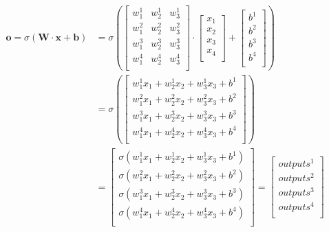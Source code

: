 \documentclass[a4paper, 10pt, twoside]{article}
\begin{document}
\begin{align*}
  \bm{o} = \sigma(\bm{W} \cdot \bm{x} + \bm{b})
  & =
  \sigma \left(
    \begin{bmatrix}
      w_1^1 & w_2^1 & w_3^1 \\
      w_1^2 & w_2^2 & w_3^2 \\
      w_1^3 & w_2^3 & w_3^3 \\
      w_1^4 & w_2^4 & w_3^4 \\
    \end{bmatrix}
    \cdot
    \begin{bmatrix}
      x_1 \\
      x_2 \\
      x_3 \\
      x_4 \\
    \end{bmatrix}
    +
    \begin{bmatrix}
      b^1 \\
      b^2 \\
      b^3 \\
      b^4 \\
    \end{bmatrix}
  \right) \\
  & =
  \sigma \left(
    \begin{bmatrix}
      w_1^1 x_1 + w_2^1 x_2 + w_3^1 x_3 + b^1 \\
      w_1^2 x_1 + w_2^2 x_2 + w_3^2 x_3 + b^2 \\
      w_1^3 x_1 + w_2^3 x_2 + w_3^3 x_3 + b^3 \\
      w_1^4 x_1 + w_2^4 x_2 + w_3^4 x_3 + b^4 \\
    \end{bmatrix}
  \right) \\
  & =
  \begin{bmatrix}
    \sigma(w_1^1 x_1 + w_2^1 x_2 + w_3^1 x_3 + b^1) \\
    \sigma(w_1^2 x_1 + w_2^2 x_2 + w_3^2 x_3 + b^2) \\
    \sigma(w_1^3 x_1 + w_2^3 x_2 + w_3^3 x_3 + b^3) \\
    \sigma(w_1^4 x_1 + w_2^4 x_2 + w_3^4 x_3 + b^4) \\
  \end{bmatrix}
  =
  \begin{bmatrix}
    \mathit{outputs^1} \\
    \mathit{outputs^2} \\
    \mathit{outputs^3} \\
    \mathit{outputs^4} \\
  \end{bmatrix}
\end{align*}
\end{document}
